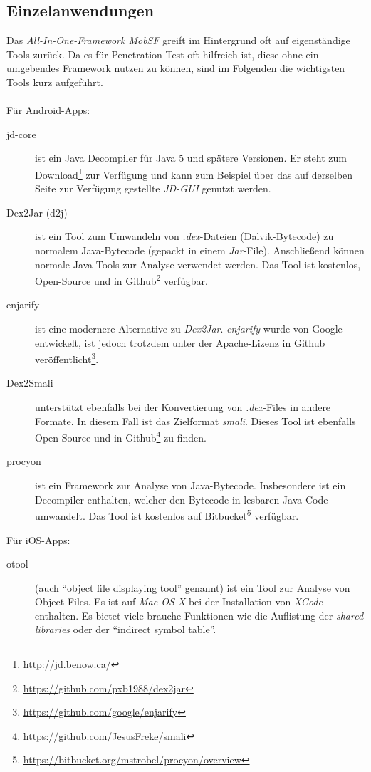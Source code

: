 \subsection{Einzelanwendungen}\label{Pen:Einzelanwendungen}
Das \textit{All-In-One-Framework MobSF} greift im Hintergrund oft auf eigenständige Tools zurück. Da es für Penetration-Test oft hilfreich ist, diese ohne ein umgebendes Framework nutzen zu können, sind im Folgenden die wichtigsten Tools kurz aufgeführt.
\\\\
Für Android-Apps:
\begin{description}
	\item[jd-core] ist ein Java Decompiler für Java 5 und spätere Versionen. Er steht zum Download\footnote{\url{http://jd.benow.ca/}} zur Verfügung und kann zum Beispiel über das auf derselben Seite zur Verfügung gestellte \textit{JD-GUI} genutzt werden.
	
	\item[Dex2Jar (d2j)] ist ein Tool zum Umwandeln von \textit{.dex}-Dateien (Dalvik-Bytecode) zu normalem Java-Bytecode (gepackt in einem \textit{Jar}-File). Anschließend können normale Java-Tools zur Analyse verwendet werden. Das Tool ist kostenlos, Open-Source und in Github\footnote{\url{https://github.com/pxb1988/dex2jar}} verfügbar.
	
	\item[enjarify]ist eine modernere Alternative zu \textit{Dex2Jar}.  \textit{enjarify} wurde von Google entwickelt, ist jedoch trotzdem unter der Apache-Lizenz in Github veröffentlicht\footnote{\url{https://github.com/google/enjarify}}.
	
	\item[Dex2Smali] unterstützt ebenfalls bei der Konvertierung von \textit{.dex}-Files in andere Formate. In diesem Fall ist das Zielformat \textit{smali}. Dieses Tool ist ebenfalls Open-Source und in Github\footnote{\url{https://github.com/JesusFreke/smali}} zu finden.
	
	\item[procyon] ist ein Framework zur Analyse von Java-Bytecode. Insbesondere ist ein Decompiler enthalten, welcher den Bytecode in lesbaren Java-Code umwandelt. Das Tool ist kostenlos auf Bitbucket\footnote{\url{https://bitbucket.org/mstrobel/procyon/overview}} verfügbar.
\end{description}
$ $\\
Für iOS-Apps:
\begin{description}
	\item[otool] (auch "`object file displaying tool"' genannt) ist ein Tool zur Analyse von Object-Files. Es ist auf \textit{Mac OS X} bei der Installation von \textit{XCode} enthalten. Es bietet viele brauche Funktionen wie die Auflistung der \textit{shared libraries} oder der "`indirect symbol table"'. 
\end{description}
